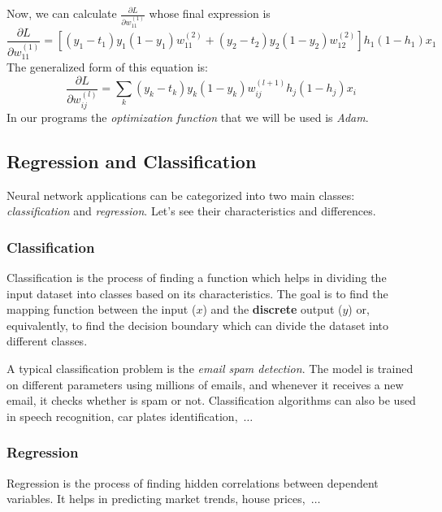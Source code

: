 Now, we can calculate $\frac{\partial L}{\partial w^{(1)}_{11}}$ %
whose final expression is
\begin{equation}
  \frac{\partial L}{\partial w^{(1)}_{11}} = [(y_1-t_1)y_1(1-y_1)w^{(2)}_{11}+(y_2-t_2)y_2(1-y_2)w^{(2)}_{12}]h_1(1-h_1)x_1	
\end{equation}
The generalized form of this equation is:
\begin{equation}
  \frac{\partial L}{\partial w^{(l)}_{ij}} = \sum_k(y_k-t_k)y_k(1-y_k)w^{(l+1)}_{ij}h_j(1-h_j)x_i
\end{equation}
In our programs the \emph{optimization function} that we will be used is \emph{Adam}.

\subsection{Regression and Classification}
\label{regression-and-classification}

Neural network applications can be categorized into two main classes: \emph{classification} and \emph{regression}. Let's see their characteristics and differences.

\subsubsection{Classification}
\label{classification}

Classification is the process of finding a function which helps in dividing the input dataset into classes based on its characteristics. The goal is to find the mapping function between the input ($x$) and the \textbf{discrete} output ($y$) or, equivalently, to find the decision boundary which can divide the dataset into different classes.

A typical classification problem is the \emph{email spam detection}. The model is trained on different parameters using millions of emails, and whenever it receives a new email, it checks whether is spam or not. Classification algorithms can also be used in speech recognition, car plates identification,~$\ldots$

\subsubsection{Regression}
\label{regression}

Regression is the process of finding hidden correlations between dependent variables. It helps in predicting market trends, house prices,~$\ldots$

